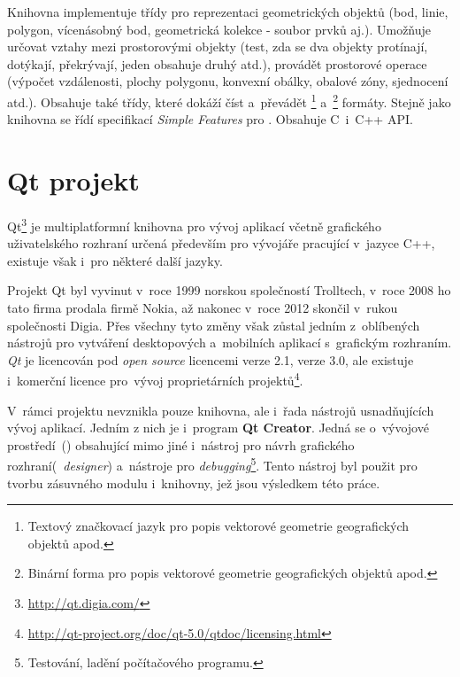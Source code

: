 Knihovna  implementuje třídy pro reprezentaci geometrických
objektů (bod, linie, polygon, vícenásobný bod, geometrická kolekce
- soubor prvků aj.). Umožňuje určovat vztahy mezi prostorovými objekty 
(test, zda se dva objekty protínají, dotýkají, překrývají, jeden obsahuje 
druhý atd.), provádět prostorové operace (výpočet vzdálenosti, plochy 
polygonu, konvexní obálky, obalové zóny, sjednocení atd.). Obsahuje také 
třídy, které dokáží číst a~převádět \footnote{Textový 
značkovací jazyk pro popis vektorové geometrie geografických objektů 
apod.} a~\footnote{Binární forma pro popis vektorové 
geometrie geografických objektů apod.} formáty. Stejně jako knihovna 
 se řídí specifikací \textit{Simple Features} pro .
Obsahuje C~i~C++ API.




\section{Qt projekt}
\label{qt}

Qt\footnote{\url{http://qt.digia.com/}} je multiplatformní knihovna pro 
vývoj aplikací včetně grafického uživatelského rozhraní určená především 
pro vývojáře pracující v~jazyce C++, existuje však i~pro některé další 
jazyky.

Projekt Qt byl vyvinut v~roce 1999 norskou společností Trolltech, v~roce 
2008 ho tato firma prodala firmě Nokia, až nakonec v~roce 2012 skončil 
v~rukou společnosti Digia. Přes všechny tyto změny však zůstal jedním 
z~oblíbených nástrojů pro vytváření desktopových a~mobilních aplikací 
s~grafickým rozhraním. \textit{Qt} je licencován pod \textit{open source} 
licencemi  verze 2.1,  verze 3.0, ale existuje i~komerční 
licence pro~vývoj proprietárních 
projektů\footnote{\url{http://qt-project.org/doc/qt-5.0/qtdoc/licensing.html}}.

V~rámci projektu nevznikla pouze knihovna, ale i~řada nástrojů usnadňujících
vývoj aplikací. Jedním z nich je i~program \textbf{Qt Creator}. Jedná se 
o~vývojové prostředí~() obsahující mimo jiné i~nástroj pro návrh 
grafického rozhraní\linebreak[10] (\textit{~designer}) a~nástroje pro 
\textit{debugging}\footnote{Testování, ladění počítačového programu.}.
Tento nástroj byl použit pro tvorbu zásuv\-ného modulu i~knihovny, jež jsou
výsledkem této práce.

